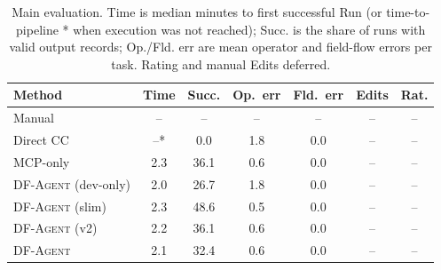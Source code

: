 \begin{table}[t]
\centering
\small
\setlength{\tabcolsep}{3pt}
\begin{tabular}{lcccccc}
\toprule
Method & Time & Succ. & Op.\ err & Fld.\ err & Edits & Rat. \\
\midrule
Manual & -- & -- & -- & -- & -- & -- \\
Direct CC & --* & 0.0 & 1.8 & 0.0 & -- & -- \\
MCP-only & 2.3 & 36.1 & 0.6 & 0.0 & -- & -- \\
\textsc{DF-Agent} (dev-only) & 2.0 & 26.7 & 1.8 & 0.0 & -- & -- \\
\textsc{DF-Agent} (slim) & 2.3 & 48.6 & 0.5 & 0.0 & -- & -- \\
\textsc{DF-Agent} (v2) & 2.2 & 36.1 & 0.6 & 0.0 & -- & -- \\
\textsc{DF-Agent} & 2.1 & 32.4 & 0.6 & 0.0 & -- & -- \\
\bottomrule
\end{tabular}
\caption{Main evaluation. Time is median minutes to first successful Run (or time-to-pipeline * when execution was not reached); Succ. is the share of runs with valid output records; Op./Fld. err are mean operator and field-flow errors per task. Rating and manual Edits deferred.}
\label{tab:eval}
\end{table}
